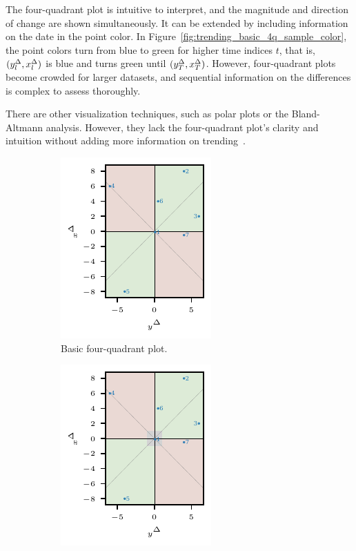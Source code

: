 The four-quadrant plot is intuitive to interpret, and the magnitude and direction of change are shown simultaneously.
It can be extended by including information on the date in the point color.
In Figure~\ref{fig:trending_basic_4q_sample_color}, the point colors turn from blue to green for higher time indices $t$, that is, $(\diffyt[l], \diffxt[l])$ is blue and turns green until $(\diffyt[T], \diffxt[T])$.
However, four-quadrant plots become crowded for larger datasets, and sequential information on the differences is complex to assess thoroughly.

There are other visualization techniques, such as polar plots or the Bland-Altmann analysis.
However, they lack the four-quadrant plot's clarity and intuition without adding more information on trending~\parencite{Saugel2015}.

\begin{figure}
\centering
\begin{subfigure}[t]{.24\textwidth}
\includegraphics{plots/illustrative_examples/4Q_without_excl}
\caption{Basic four-quadrant plot.} \label{fig:trending_basic_4q}
\end{subfigure}\hspace{0.01\textwidth}%
\begin{subfigure}[t]{.24\textwidth}
\includegraphics{plots/illustrative_examples/4q_excl_box}

\end{subfigure}
\end{figure}

